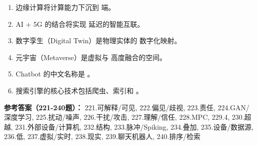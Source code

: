\begin{enumerate}[resume,leftmargin=2em,itemsep=1pt]
\item 边缘计算将计算能力下沉到 \underline{\hspace{3em}} 端。
\item AI + 5G 的结合将实现 \underline{\hspace{3em}} 延迟的智能互联。
\item 数字孪生（Digital Twin）是物理实体的 \underline{\hspace{3em}} 数字化映射。
\item 元宇宙（Metaverse）是虚拟与 \underline{\hspace{3em}} 高度融合的空间。
\item Chatbot 的中文名称是 \underline{\hspace{3em}}。
\item 搜索引擎的核心技术包括爬虫、索引和 \underline{\hspace{3em}}。
\end{enumerate}

\textbf{参考答案（221-240题）：}
221.可解释/可见, 222.偏见/歧视, 223.责任, 224.GAN/深度学习, 225.扰动/噪声, 226.干扰/攻击, 227.理解/信任, 228.MPC, 229.4, 230.超越, 231.外部设备/计算机, 232.结构, 233.脉冲/Spiking, 234.叠加, 235.设备/数据源, 236.低, 237.虚拟/实时, 238.现实, 239.聊天机器人, 240.排序/检索

